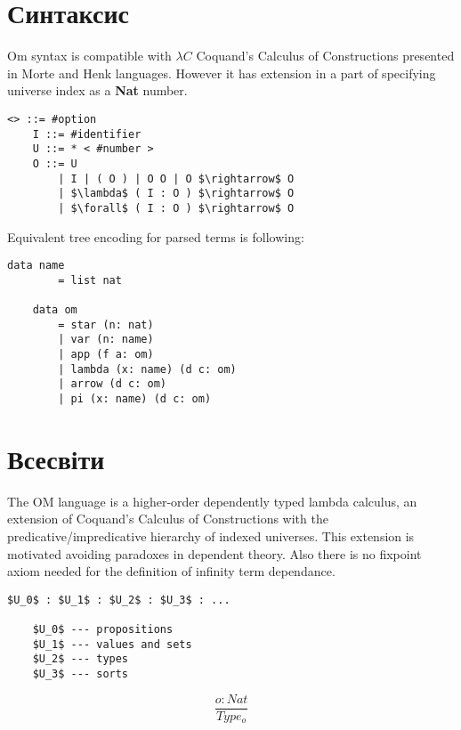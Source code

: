    \section{Синтаксис}
\vspace{0.5cm}
   Om syntax is compatible with $\lambda C$ Coquand's Calculus of Constructions presented
   in Morte and Henk languages. However it has extension in a part of specifying
   universe index as a {\bf Nat} number.

\vspace{0.5cm}
\begin{lstlisting}[mathescape=true]
   <> ::= #option
    I ::= #identifier
    U ::= * < #number >
    O ::= U
        | I | ( O ) | O O | O $\rightarrow$ O
        | $\lambda$ ( I : O ) $\rightarrow$ O
        | $\forall$ ( I : O ) $\rightarrow$ O
\end{lstlisting}

Equivalent tree encoding for parsed terms is following:
\vspace{0.5cm}
\begin{lstlisting}[mathescape=true]
    data name
        = list nat

    data om
        = star (n: nat)
        | var (n: name)
        | app (f a: om)
        | lambda (x: name) (d c: om)
        | arrow (d c: om)
        | pi (x: name) (d c: om)
\end{lstlisting}

\newpage
\section{Всесвіти}

The OM language is a higher-order dependently typed lambda calculus,
an extension of Coquand's Calculus of Constructions
with the predicative/impredicative hierarchy of indexed universes.
This extension is motivated avoiding paradoxes in dependent theory.
Also there is no fixpoint axiom needed for the definition
of infinity term dependance.

\vspace{0.5cm}
\begin{lstlisting}[mathescape=true]
    $U_0$ : $U_1$ : $U_2$ : $U_3$ : ...

    $U_0$ --- propositions
    $U_1$ --- values and sets
    $U_2$ --- types
    $U_3$ --- sorts
\end{lstlisting}

\begin{equation}
\tag{S}
\dfrac
{o : Nat}
{Type_o}
\end{equation}

